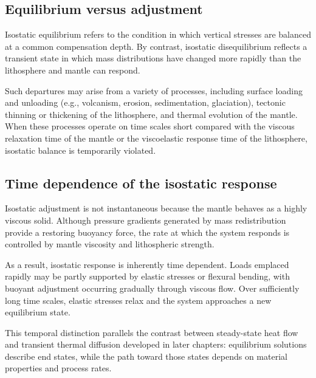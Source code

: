 \subsection{Equilibrium versus adjustment}

Isostatic equilibrium refers to the condition in which vertical stresses are balanced at a common compensation depth. By contrast, isostatic disequilibrium reflects a transient state in which mass distributions have changed more rapidly than the lithosphere and mantle can respond.

Such departures may arise from a variety of processes, including surface loading and unloading (e.g., volcanism, erosion, sedimentation, glaciation), tectonic thinning or thickening of the lithosphere, and thermal evolution of the mantle. When these processes operate on time scales short compared with the viscous relaxation time of the mantle or the viscoelastic response time of the lithosphere, isostatic balance is temporarily violated.

\subsection{Time dependence of the isostatic response}

Isostatic adjustment is not instantaneous because the mantle behaves as a highly viscous solid. Although pressure gradients generated by mass redistribution provide a restoring buoyancy force, the rate at which the system responds is controlled by mantle viscosity and lithospheric strength.

As a result, isostatic response is inherently time dependent. Loads emplaced rapidly may be partly supported by elastic stresses or flexural bending, with buoyant adjustment occurring gradually through viscous flow. Over sufficiently long time scales, elastic stresses relax and the system approaches a new equilibrium state.

This temporal distinction parallels the contrast between steady-state heat flow and transient thermal diffusion developed in later chapters: equilibrium solutions describe end states, while the path toward those states depends on material properties and process rates.

